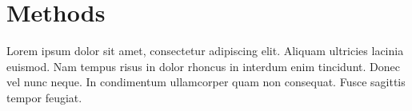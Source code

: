 

		\medskip

\section{Methods}

\noindent Lorem ipsum dolor sit amet, consectetur adipiscing elit. Aliquam ultricies lacinia euismod. Nam tempus risus in dolor rhoncus in interdum enim tincidunt. Donec vel nunc neque. In condimentum ullamcorper quam non consequat. Fusce sagittis tempor feugiat. 


